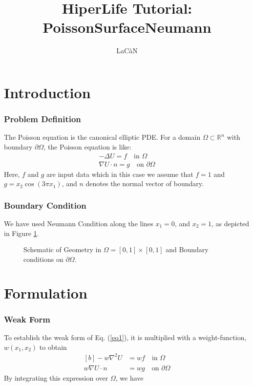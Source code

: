 \documentclass[]{article}
\begin{document}
\title{HiperLife Tutorial: PoissonSurfaceNeumann}
\author{LaCàN}
\maketitle

\linenumbers
\section{Introduction} \label{sec: Int}
\subsubsection{Problem Definition} \label{sec: pd} 
The Poisson equation is the canonical elliptic PDE. For a domain $\Omega \subset \mathbb{R}^n$ with boundary $\partial \Omega$, the Poisson equation is like:
\begin{equation}\label{eq1}
	\begin{aligned}
		 -\Delta U =f \quad  \text{in } \Omega \\
		 \nabla U \cdot n = g  \quad  \text{on }  \partial \Omega
	\end{aligned}
\end{equation}
Here, $f$ and $g$ are input data which in this case we assume that $f = 1$ and $g=x_{2}\cos{(3\pi x_{1})}$, and $n$ denotes the normal vector of boundary.
\subsubsection{Boundary Condition} \label{sec: B.C}
We have used Neumann Condition along the lines $x_{1}=0$, and $x_{2}=1$, as depicted in Figure \ref{fig_SB}.

\begin{figure}[htbp]
	\centering
	
	\caption{Schematic of Geometry in $\Omega =[0,1]\times[0,1]$ and Boundary conditions on $\partial \Omega$.}
	\label{fig_SB}
\end{figure}

\section{Formulation} \label{sec: frml}
\subsubsection{Weak Form} \label{sec: WF}
To establish the weak form of Eq. (\ref{eq1}), it is multiplied with a weight-function, $w(x_1, x_2)$ to obtain
\begin{equation}\label{eq2}
	\begin{aligned}[b]
		-w\nabla^2 U &= wf \quad  \text{in }  \Omega \\
		w\nabla U \cdot n &= wg  \quad  \text{on }  \partial \Omega
	\end{aligned}
\end{equation}
By integrating this expression over $\Omega$, we have
\end{document}
